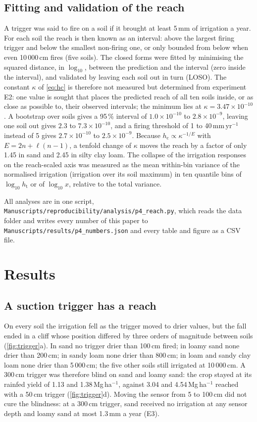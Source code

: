 \documentclass[review,12pt,authoryear]{elsarticle}
\newcommand{\hc}{h_{\mathrm{c}}}
\newcommand{\htr}{h_{\mathrm{t}}}
\begin{document}
\subsection{Fitting and validation of the reach}
A trigger was said to fire on a soil if it brought at least 5\,mm of irrigation a year. For each soil the reach is then known as an interval: above the largest firing trigger and below the smallest non-firing one, or only bounded from below when even 10\,000\,cm fires (five soils). The closed forms were fitted by minimising the squared distance, in $\log_{10}$, between the prediction and the interval (zero inside the interval), and validated by leaving each soil out in turn (LOSO). The constant $\kappa$ of \cref{eq:hc} is therefore not measured but determined from experiment E2: one value is sought that places the predicted reach of all ten soils inside, or as close as possible to, their observed intervals; the minimum lies at $\kappa=3.47\times10^{-10}$. A bootstrap over soils gives a 95\,\% interval of $1.0\times10^{-10}$ to $2.8\times10^{-9}$, leaving one soil out gives $2.3$ to $7.3\times10^{-10}$, and a firing threshold of 1 to 40\,mm\,yr$^{-1}$ instead of 5 gives $2.7\times10^{-10}$ to $2.5\times10^{-9}$. Because $\hc\propto\kappa^{-1/E}$ with $E=2n+\ell(n-1)$, a tenfold change of $\kappa$ moves the reach by a factor of only 1.45 in sand and 2.45 in silty clay loam. The collapse of the irrigation responses on the reach-scaled axis was measured as the mean within-bin variance of the normalised irrigation (irrigation over its soil maximum) in ten quantile bins of $\log_{10}\htr$ or of $\log_{10}x$, relative to the total variance.

All analyses are in one script, \texttt{Manuscripts/reproducibility/analysis/p4\_reach.py}, which reads the data folder and writes every number of this paper to \texttt{Manuscripts/results/p4\_numbers.json} and every table and figure as a CSV file.

\section{Results}
\subsection{A suction trigger has a reach}
On every soil the irrigation fell as the trigger moved to drier values, but the fall ended in a cliff whose position differed by three orders of magnitude between soils (\cref{fig:trigger}a). In sand no trigger drier than 100\,cm fired; in loamy sand none drier than 200\,cm; in sandy loam none drier than 800\,cm; in loam and sandy clay loam none drier than 5\,000\,cm; the five other soils still irrigated at 10\,000\,cm. A 300\,cm trigger was therefore blind on sand and loamy sand: the crop stayed at its rainfed yield of 1.13 and 1.38\,Mg\,ha$^{-1}$, against 3.04 and 4.54\,Mg\,ha$^{-1}$ reached with a 50\,cm trigger (\cref{fig:trigger}d). Moving the sensor from 5 to 100\,cm did not cure the blindness: at a 300\,cm trigger, sand received no irrigation at any sensor depth and loamy sand at most 1.3\,mm a year (E3).
\end{document}
